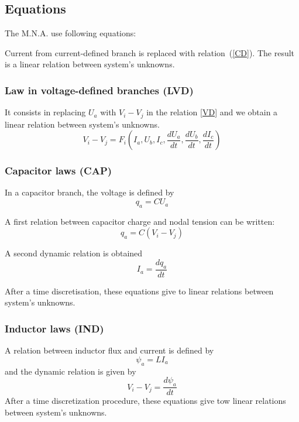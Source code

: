 \subsection{Equations}
The M.N.A. use following equations:


Current from current-defined branch is replaced with relation~(\ref{CD}). The result is a linear relation between system's unknowns.
\subsubsection{Law in voltage-defined branches (LVD)}
It consists in replacing $U_{a}$ with $V_{i}-V_{j}$ in the relation \ref{VD} and we obtain a linear relation between system's unknowns.
\[V_{i}-V_{j}=F_{i}(I_{a},U_{b},I_{c},\frac{dU_a}{dt},\frac{dU_b}{dt},\frac{dI_{c}}{dt})\]
\subsubsection{Capacitor laws (CAP)}
In a capacitor branch, the voltage is defined by 
\begin{equation}
 q_{a}=CU_{a} 
\end{equation}

A first relation between capacitor charge and nodal tension can be written:\\
\begin{equation}
 q_{a}=C(V_{i}-V_{j})\label{eq:CAP1}\tag{CAP1}
\end{equation}

A second dynamic relation is obtained
\begin{equation}
I_{a}=\frac{dq_{a}}{dt} \label{eq:CAP2}\tag{CAP2}
\end{equation}


After a time discretisation, these equations give to linear relations between system's unknowns.
\subsubsection{Inductor laws (IND)}
A relation between inductor flux and current is defined by
\begin{equation}
\psi _{a}=LI_{a}\label{eq:IND1}\tag{IND1}
\end{equation}
and the  dynamic relation is given by
\begin{equation}
  \label{eq:IND2}
   V_{i}-V_{j}=\frac{d\psi _{a}}{dt} \tag{IND2}
\end{equation}
After a time discretization procedure, these equations give tow linear relations between system's unknowns.

